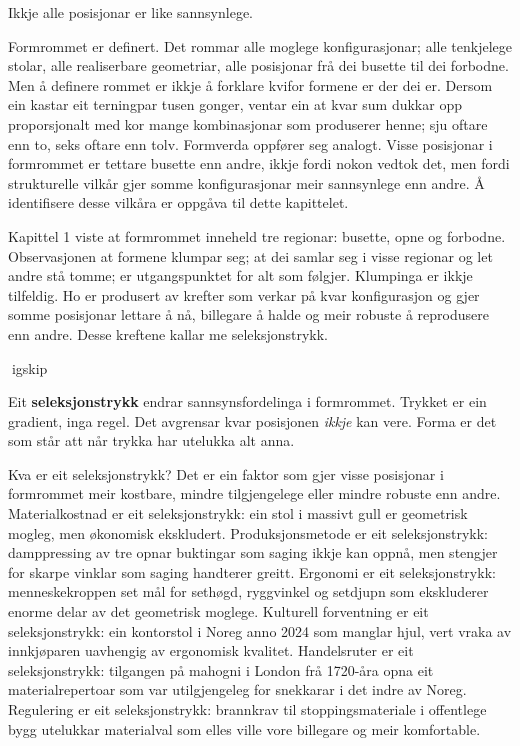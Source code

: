
Ikkje alle posisjonar er like sannsynlege.

Formrommet er definert. Det rommar alle moglege konfigurasjonar; alle tenkjelege stolar, alle realiserbare geometriar, alle posisjonar frå dei busette til dei forbodne. Men å definere rommet er ikkje å forklare kvifor formene er der dei er. Dersom ein kastar eit terningpar tusen gonger, ventar ein at kvar sum dukkar opp proporsjonalt med kor mange kombinasjonar som produserer henne; sju oftare enn to, seks oftare enn tolv. Formverda oppfører seg analogt. Visse posisjonar i formrommet er tettare busette enn andre, ikkje fordi nokon vedtok det, men fordi strukturelle vilkår gjer somme konfigurasjonar meir sannsynlege enn andre. Å identifisere desse vilkåra er oppgåva til dette kapittelet.

Kapittel 1 viste at formrommet inneheld tre regionar: busette, opne og forbodne. Observasjonen at formene klumpar seg; at dei samlar seg i visse regionar og let andre stå tomme; er utgangspunktet for alt som følgjer. Klumpinga er ikkje tilfeldig. Ho er produsert av krefter som verkar på kvar konfigurasjon og gjer somme posisjonar lettare å nå, billegare å halde og meir robuste å reprodusere enn andre. Desse kreftene kallar me seleksjonstrykk.

igskip

Eit \textbf{seleksjonstrykk} endrar sannsynsfordelinga i formrommet. Trykket er ein gradient, inga regel. Det avgrensar kvar posisjonen \textit{ikkje} kan vere. Forma er det som står att når trykka har utelukka alt anna.

Kva er eit seleksjonstrykk? Det er ein faktor som gjer visse posisjonar i formrommet meir kostbare, mindre tilgjengelege eller mindre robuste enn andre. Materialkostnad er eit seleksjonstrykk: ein stol i massivt gull er geometrisk mogleg, men økonomisk ekskludert. Produksjonsmetode er eit seleksjonstrykk: damppressing av tre opnar buktingar som saging ikkje kan oppnå, men stengjer for skarpe vinklar som saging handterer greitt. Ergonomi er eit seleksjonstrykk: menneskekroppen set mål for sethøgd, ryggvinkel og setdjupn som ekskluderer enorme delar av det geometrisk moglege. Kulturell forventning er eit seleksjonstrykk: ein kontorstol i Noreg anno 2024 som manglar hjul, vert vraka av innkjøparen uavhengig av ergonomisk kvalitet. Handelsruter er eit seleksjonstrykk: tilgangen på mahogni i London frå 1720-åra opna eit materialrepertoar som var utilgjengeleg for snekkarar i det indre av Noreg. Regulering er eit seleksjonstrykk: brannkrav til stoppingsmateriale i offentlege bygg utelukkar materialval som elles ville vore billegare og meir komfortable.

